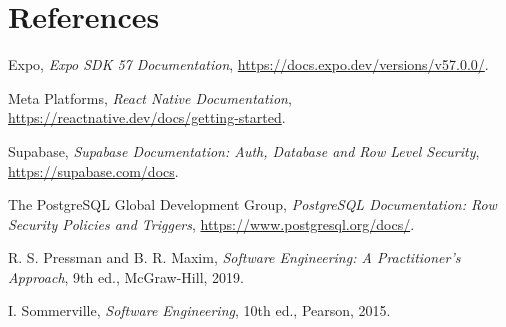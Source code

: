 \documentclass{tietreport}
\renewcommand{\_}{\textunderscore\allowbreak}
\begin{document}

\section*{References}

\begin{enumerate}[label={[\arabic*]}]
  \item Expo, \textit{Expo SDK 57 Documentation},
  \url{https://docs.expo.dev/versions/v57.0.0/}.
  \item Meta Platforms, \textit{React Native Documentation},
  \url{https://reactnative.dev/docs/getting-started}.
  \item Supabase, \textit{Supabase Documentation: Auth, Database and Row
  Level Security}, \url{https://supabase.com/docs}.
  \item The PostgreSQL Global Development Group, \textit{PostgreSQL
  Documentation: Row Security Policies and Triggers},
  \url{https://www.postgresql.org/docs/}.
  \item R. S. Pressman and B. R. Maxim, \textit{Software Engineering: A
  Practitioner's Approach}, 9th ed., McGraw-Hill, 2019.
  \item I. Sommerville, \textit{Software Engineering}, 10th ed., Pearson,
  2015.
\end{enumerate}
\end{document}
